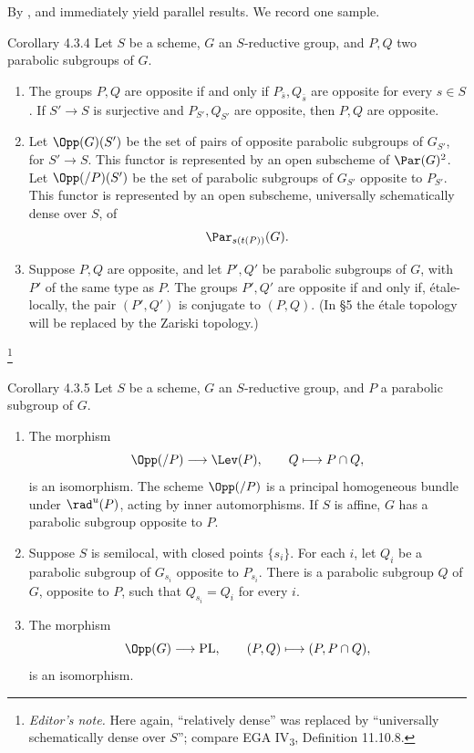 By \textup{},  and  immediately yield
parallel results.  We record one sample.

\begin{sgastatement}{Corollary 4.3.4}
Let \(S\) be a scheme, \(G\) an \(S\)-reductive group, and \(P,Q\) two
parabolic subgroups of \(G\).
\begin{enumerate}[label=\textup{(\roman*)}]
\item The groups \(P,Q\) are opposite if and only if
\(P_{\bar s},Q_{\bar s}\) are opposite for every \(s\in S\).  If
\(S'\to S\) is surjective and \(P_{S'},Q_{S'}\) are opposite, then
\(P,Q\) are opposite.
\item Let \(\Opp(G)(S')\) be the set of pairs of opposite parabolic
subgroups of \(G_{S'}\), for \(S'\to S\).  This functor is represented
by an open subscheme of \(\Par(G)^2\).  Let \(\Opp(/P)(S')\) be the set
of parabolic subgroups of \(G_{S'}\) opposite to \(P_{S'}\).  This
functor is represented by an open subscheme, universally schematically
dense over \(S\), of
\[
 \Par_{s(t(P))}(G).
\]
\item Suppose \(P,Q\) are opposite, and let \(P',Q'\) be parabolic
subgroups of \(G\), with \(P'\) of the same type as \(P\).  The groups
\(P',Q'\) are opposite if and only if, étale-locally, the pair
\((P',Q')\) is conjugate to \((P,Q)\).
\textup{(In §5 the étale topology will be replaced by the Zariski
topology.)}
\end{enumerate}
\end{sgastatement}
\footnote{\emph{Editor's note.} Here again, ``relatively dense'' was
replaced by ``universally schematically dense over \(S\)''; compare
EGA IV\textsubscript{3}, Definition 11.10.8.}

\begin{sgastatement}{Corollary 4.3.5}
Let \(S\) be a scheme, \(G\) an \(S\)-reductive group, and \(P\) a
parabolic subgroup of \(G\).
\begin{enumerate}[label=\textup{(\roman*)}]
\item The morphism
\[
 \Opp(/P)\longrightarrow\Lev(P),\qquad Q\longmapsto P\cap Q,
\]
is an isomorphism.  The scheme \(\Opp(/P)\) is a principal homogeneous
bundle under \(\rad^u(P)\), acting by inner automorphisms.  If \(S\) is
affine, \(G\) has a parabolic subgroup opposite to \(P\).
\item Suppose \(S\) is semilocal, with closed points \(\{s_i\}\).  For
each \(i\), let \(Q_i\) be a parabolic subgroup of \(G_{s_i}\) opposite
to \(P_{s_i}\).  There is a parabolic subgroup \(Q\) of \(G\), opposite
to \(P\), such that \(Q_{s_i}=Q_i\) for every \(i\).
\item The morphism
\[
 \Opp(G)\longrightarrow\mathrm{PL},\qquad
 (P,Q)\longmapsto(P,P\cap Q),
\]
is an isomorphism.
\end{enumerate}
\end{sgastatement}

